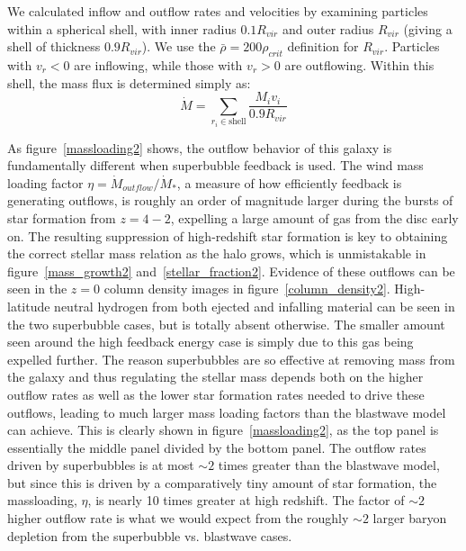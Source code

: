 We calculated inflow and outflow rates and velocities by examining particles
within a spherical shell, with inner radius $0.1R_{vir}$ and outer radius
$R_{vir}$ (giving a shell of thickness $0.9R_{vir}$).  We use the $\bar\rho =
200\rho_{crit}$ definition for $R_{vir}$.  Particles with $v_r < 0$ are
inflowing, while those with $v_r > 0$ are outflowing.
Within this shell, the mass flux is determined simply as:
\begin{equation}
    \dot M = \sum_{r_i\in\mathrm{shell}}\frac{M_i v_i}{0.9R_{vir}}
    \label{halo_massflux2}
\end{equation}

As figure~\ref{massloading2} shows, the outflow behavior of this galaxy is
fundamentally different when superbubble feedback is used.  The wind mass
loading factor $\eta = \dot M_{outflow} / \dot M_*$, a measure of how
efficiently feedback is generating outflows, is roughly an order of magnitude
larger during the bursts of star formation from $z=4-2$, expelling a large
amount of gas from the disc early on.  The resulting suppression of
high-redshift star formation is key to obtaining the correct stellar mass
relation as the halo grows, which is unmistakable in figure~\ref{mass_growth2}
and~\ref{stellar_fraction2}.  Evidence of these outflows can be seen in the $z=0$
column density images in figure~\ref{column_density2}.  High-latitude neutral
hydrogen from both ejected and infalling material can be seen in the two
superbubble cases, but is totally absent otherwise.  The smaller amount seen
around the high feedback energy case is simply due to this gas being expelled
further.  The reason superbubbles are so effective at removing mass from the
galaxy and thus regulating the stellar mass depends both on the higher outflow
rates as well as the lower star formation rates needed to drive these outflows,
leading to much larger mass loading factors than the blastwave model can
achieve.  This is clearly shown in figure~\ref{massloading2}, as the top panel is
essentially the middle panel divided by the bottom panel.  The outflow rates
driven by superbubbles is at most $\sim2$ times greater than the blastwave model,
but since this is driven by a comparatively tiny amount of star formation, the
massloading, $\eta$, is nearly 10 times greater at high redshift.  The factor of
$\sim2$ higher outflow rate is what we would expect from the roughly $\sim2$
larger baryon depletion from the superbubble vs. blastwave cases.

